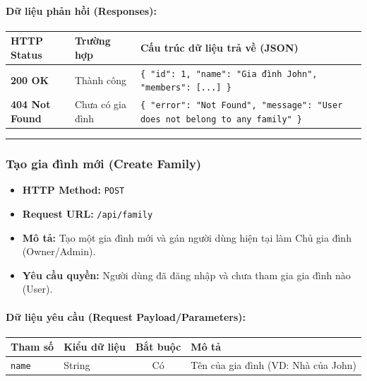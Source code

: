 \documentclass[12pt,a4paper]{article}
\begin{document}
\paragraph{Dữ liệu phản hồi (Responses):}
\begin{longtable}{|>{\raggedright\arraybackslash}p{2.8cm}|>{\raggedright\arraybackslash}p{3.2cm}|>{\raggedright\arraybackslash}p{8.0cm}|}
\hline
\textbf{HTTP Status} & \textbf{Trường hợp} & \textbf{Cấu trúc dữ liệu trả về (JSON)} \\ \hline
\endhead
\textbf{200 OK} & Thành công & \texttt{\{ "id": 1, "name": "Gia đình John", "members": [...] \}} \\ \hline
\textbf{404 Not Found} & Chưa có gia đình & \texttt{\{ "error": "Not Found", "message": "User does not belong to any family" \}} \\ \hline
\end{longtable}

\vskip 0.4cm
\noindent\rule{\textwidth}{0.3pt}
\vskip 0.4cm

\subsubsection{Tạo gia đình mới (Create Family)}
\begin{itemize}[leftmargin=*]
    \item \textbf{HTTP Method:} \texttt{POST}
    \item \textbf{Request URL:} \texttt{/api/family}
    \item \textbf{Mô tả:} Tạo một gia đình mới và gán người dùng hiện tại làm Chủ gia đình (Owner/Admin).
    \item \textbf{Yêu cầu quyền:} Người dùng đã đăng nhập và chưa tham gia gia đình nào (User).
\end{itemize}

\paragraph{Dữ liệu yêu cầu (Request Payload/Parameters):}
\begin{longtable}{|>{\raggedright\arraybackslash}p{2.8cm}|>{\raggedright\arraybackslash}p{2.2cm}|c|>{\raggedright\arraybackslash}p{7.0cm}|}
\hline
\textbf{Tham số} & \textbf{Kiểu dữ liệu} & \textbf{Bắt buộc} & \textbf{Mô tả} \\ \hline
\endhead
\texttt{name} & String & Có & Tên của gia đình (VD: Nhà của John) \\ \hline
\end{longtable}
\end{document}
